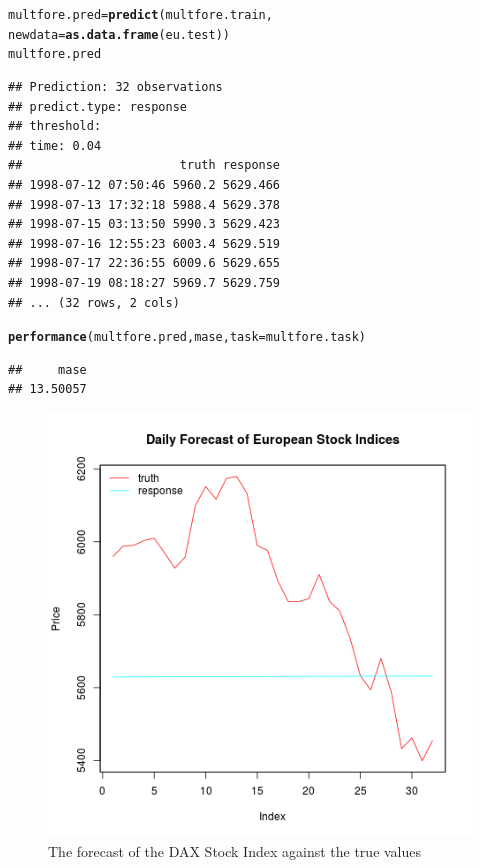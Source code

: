 \documentclass[12pt]{article}\usepackage[]{graphicx}\usepackage[]{color}
\makeatletter
\newcommand{\hlstd}[1]{\textcolor[rgb]{0.345,0.345,0.345}{#1}}%
\newcommand{\hlkwb}[1]{\textcolor[rgb]{0.69,0.353,0.396}{#1}}%
\newcommand{\hlkwc}[1]{\textcolor[rgb]{0.333,0.667,0.333}{#1}}%
\newcommand{\hlkwd}[1]{\textcolor[rgb]{0.737,0.353,0.396}{\textbf{#1}}}%
\newenvironment{kframe}{%
 \def\at@end@of@kframe{}%
 \ifinner\ifhmode%
  \def\at@end@of@kframe{\end{minipage}}%
  \begin{minipage}{\columnwidth}%
 \fi\fi%
 \def\FrameCommand##1{\hskip\@totalleftmargin \hskip-\fboxsep
 \colorbox{shadecolor}{##1}\hskip-\fboxsep
     \hskip-\linewidth \hskip-\@totalleftmargin \hskip\columnwidth}%
 \MakeFramed {\advance\hsize-\width
   \@totalleftmargin\z@ \linewidth\hsize
   \@setminipage}}%
 {\par\unskip\endMakeFramed%
 \at@end@of@kframe}
\newenvironment{knitrout}{}{} %
\theoremstyle{definition}
\makeatother
\begin{document}
\begin{knitrout}
\color{fgcolor}\begin{kframe}
\begin{alltt}
\hlstd{multfore.pred} \hlkwb{=} \hlkwd{predict}\hlstd{(multfore.train,}
                  \hlkwc{newdata} \hlstd{=} \hlkwd{as.data.frame}\hlstd{(eu.test))}
\hlstd{multfore.pred}
\end{alltt}
\begin{verbatim}
## Prediction: 32 observations
## predict.type: response
## threshold: 
## time: 0.04
##                      truth response
## 1998-07-12 07:50:46 5960.2 5629.466
## 1998-07-13 17:32:18 5988.4 5629.378
## 1998-07-15 03:13:50 5990.3 5629.423
## 1998-07-16 12:55:23 6003.4 5629.519
## 1998-07-17 22:36:55 6009.6 5629.655
## 1998-07-19 08:18:27 5969.7 5629.759
## ... (32 rows, 2 cols)
\end{verbatim}
\begin{alltt}
\hlkwd{performance}\hlstd{(multfore.pred, mase,} \hlkwc{task} \hlstd{= multfore.task)}
\end{alltt}
\begin{verbatim}
##     mase 
## 13.50057
\end{verbatim}
\end{kframe}
\end{knitrout}
\doublespacing



\begin{figure}[h!]
\includegraphics[width=\linewidth]{multfore_tune.png}
\centering
\caption{The forecast of the DAX Stock Index against the true values}
\label{fig:multfore_tune}
\end{figure}
\end{document}
